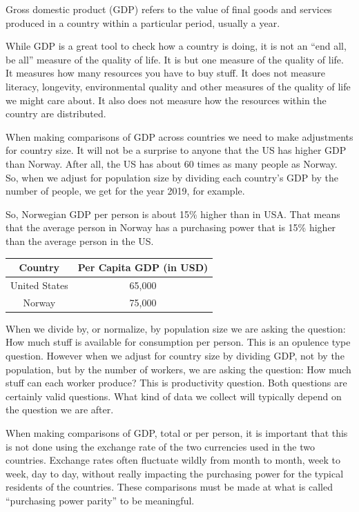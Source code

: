 \documentclass[
]{book}
\begin{document}
Gross domestic product (GDP) refers to the value of final goods and services produced in a country within a particular period, usually a year.

While GDP is a great tool to check how a country is doing, it is not an ``end all, be all'' measure of the quality of life. It is but one measure of the quality of life. It measures how many resources you have to buy stuff. It does not measure literacy, longevity, environmental quality and other measures of the quality of life we might care about. It also does not measure how the resources within the country are distributed.

When making comparisons of GDP across countries we need to make adjustments for country size. It will not be a surprise to anyone that the US has higher GDP than Norway. After all, the US has about 60 times as many people as Norway. So, when we adjust for population size by dividing each country's GDP by the number of people, we get for the year 2019, for example.

So, Norwegian GDP per person is about 15\% higher than in USA. That means that the average person in Norway has a purchasing power that is 15\% higher than the average person in the US.

\begin{longtable}[]{@{}cc@{}}
\toprule\noalign{}
Country & Per Capita GDP (in USD) \\
\midrule\noalign{}
\endhead
\bottomrule\noalign{}
\endlastfoot
United States & 65,000 \\
Norway & 75,000 \\
\end{longtable}

When we divide by, or normalize, by population size we are asking the question: How much stuff is available for consumption per person. This is an opulence type question. However when we adjust for country size by dividing GDP, not by the population, but by the number of workers, we are asking the question: How much stuff can each worker produce? This is productivity question. Both questions are certainly valid questions. What kind of data we collect will typically depend on the question we are after.

When making comparisons of GDP, total or per person, it is important that this is not done using the exchange rate of the two currencies used in the two countries. Exchange rates often fluctuate wildly from month to month, week to week, day to day, without really impacting the purchasing power for the typical residents of the countries. These comparisons must be made at what is called ``purchasing power parity'' to be meaningful.
\end{document}
